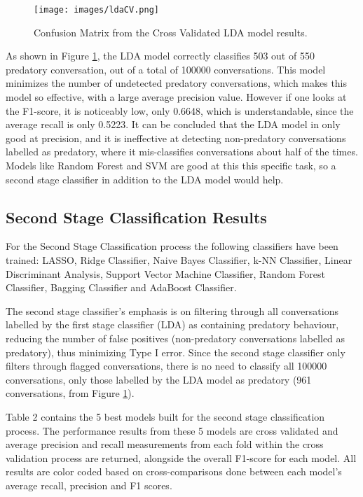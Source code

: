 \documentclass[11pt]{article}
\begin{document}
\begin{figure}[h!]
    \centering
    \texttt{[image: images/ldaCV.png]}
    \caption{Confusion Matrix from the Cross Validated LDA model results.}
    \label{fig:ldaCV}
\end{figure}

As shown in Figure \ref{fig:ldaCV}, the LDA model correctly classifies 503 out of 550 predatory conversation, out of a total of 100000 conversations. This model minimizes the number of undetected predatory conversations, which makes this model so effective, with a large average precision value. However if one looks at the F1-score, it is noticeably low, only 0.6648, which is understandable, since the average recall is only 0.5223. It can be concluded that the LDA model in only good at precision, and it is ineffective at detecting non-predatory conversations labelled as predatory, where it mis-classifies conversations about half of the times. Models like Random Forest and SVM are good at this this specific task, so a second stage classifier in addition to the LDA model would help. 

\subsection{Second Stage Classification Results}
For the Second Stage Classification process the following classifiers have been trained: LASSO, Ridge Classifier, Naive Bayes Classifier, k-NN Classifier, Linear Discriminant Analysis, Support Vector Machine Classifier, Random Forest Classifier, Bagging Classifier and AdaBoost Classifier.

The second stage classifier's emphasis is on filtering through all conversations labelled by the first stage classifier (LDA) as containing predatory behaviour, reducing the number of false positives (non-predatory conversations labelled as predatory), thus minimizing Type I error. Since the second stage classifier only filters through flagged conversations, there is no need to classify all 100000 conversations, only those labelled by the LDA model as predatory (961 conversations, from Figure \ref{fig:ldaCV}).

Table 2 contains the 5 best models built for the second stage classification process. The performance results from these 5 models are cross validated and average precision and recall measurements from each fold within the cross validation process are returned, alongside the overall F1-score for each model. All results are color coded based on cross-comparisons done between each model's average recall, precision and F1 scores.
\end{document}
